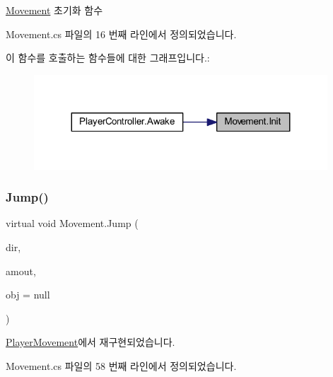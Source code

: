\mbox{\hyperlink{class_movement}{Movement}} 초기화 함수 



Movement.\+cs 파일의 16 번째 라인에서 정의되었습니다.


\begin{DoxyCode}{0}

\end{DoxyCode}
이 함수를 호출하는 함수들에 대한 그래프입니다.\+:
\nopagebreak
\begin{figure}[H]
\begin{center}
\leavevmode
\includegraphics[width=311pt]{d1/de2/class_movement_a1c50c07edbe274e1cf55253e87506684_icgraph}
\end{center}
\end{figure}
\mbox{\label{class_movement_a561e8f643a3f3cd6b0b6789c72161e98}} 
\subsubsection{\texorpdfstring{Jump()}{Jump()}}
{\footnotesize\ttfamily virtual void Movement.\+Jump (\begin{DoxyParamCaption}\item[{Vector2}]{dir,  }\item[{float}]{amout,  }\item[{Game\+Object}]{obj = {\ttfamily null} }\end{DoxyParamCaption})\hspace{0.3cm}{\ttfamily [virtual]}}



\mbox{\hyperlink{class_player_movement_a64ce92029a6d91f12d23332bdd44a6ab}{Player\+Movement}}에서 재구현되었습니다.



Movement.\+cs 파일의 58 번째 라인에서 정의되었습니다.


